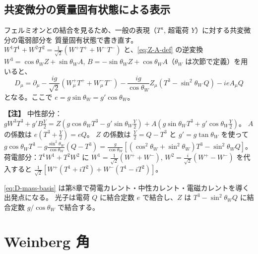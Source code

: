 \documentclass[uplatex,dvipdfmx,a4paper,11pt,openany]{jsbook}
\newenvironment{note}{\vspace{1ex}\par\footnotesize\noindent\textbf{【注】}}{\par\vspace{1ex}}
\numberwithin{equation}{chapter}
\theoremstyle{definition}
\theoremstyle{plain}
\theoremstyle{remark}
\begin{document}
\subsection{共変微分の質量固有状態による表示}
フェルミオンとの結合を見るため、一般の表現（$T^a$, 超電荷 $Y$）に対する共変微分の電弱部分を
質量固有状態で書き直す。$W^1T^1+W^2T^2=\frac{1}{\sqrt2}(W^+T^++W^-T^-)$ と、\eqref{eq:Z-A-def} の逆変換
$W^3=\cos\theta_W Z+\sin\theta_W A$, $B=-\sin\theta_W Z+\cos\theta_W A$（$\theta_W$ は次節で定義）を用いると、
\begin{equation}
\boxed{
D_\mu=\partial_\mu-\frac{ig}{\sqrt2}\left(W^+_\mu T^++W^-_\mu T^-\right)
-\frac{ig}{\cos\theta_W}Z_\mu\left(T^3-\sin^2\theta_W\,Q\right)
-ieA_\mu Q
}
\label{eq:D-mass-basis}
\end{equation}
となる。ここで $e=g\sin\theta_W=g'\cos\theta_W$。
\begin{note}
中性部分：$gW^3T^3+g'B\frac Y2=Z\left(g\cos\theta_WT^3-g'\sin\theta_W\frac Y2\right)+A\left(g\sin\theta_WT^3+g'\cos\theta_W\frac Y2\right)$。
$A$ の係数は $e(T^3+\frac Y2)=eQ$。
$Z$ の係数は $\frac Y2=Q-T^3$ と $g'=g\tan\theta_W$ を使って
$g\cos\theta_WT^3-g\frac{\sin^2\theta_W}{\cos\theta_W}(Q-T^3)=\frac{g}{\cos\theta_W}\left[(\cos^2\theta_W+\sin^2\theta_W)T^3-\sin^2\theta_WQ\right]$。
荷電部分：$T^1W^1+T^2W^2$ に $W^1=\frac{1}{\sqrt2}(W^++W^-)$, $W^2=\frac{i}{\sqrt2}(W^+-W^-)$ を代入すると
$\frac{1}{\sqrt2}\left[W^+(T^1+iT^2)+W^-(T^1-iT^2)\right]$。
\end{note}
\eqref{eq:D-mass-basis} は第8章で荷電カレント・中性カレント・電磁カレントを導く出発点になる。
光子は電荷 $Q$ に結合定数 $e$ で結合し、$Z$ は $T^3-\sin^2\theta_WQ$ に結合定数 $g/\cos\theta_W$ で結合する。
\section{Weinberg 角}
\label{sec:weinberg-angle}
\end{document}
